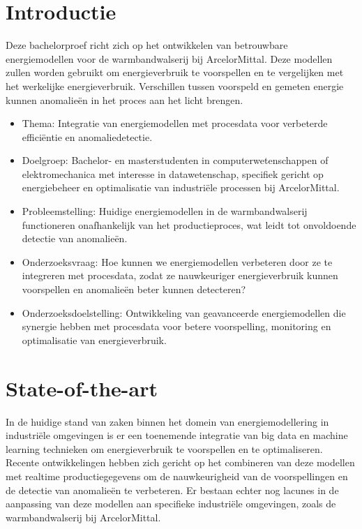 \section{Introductie}%
\label{sec:introductie}

Deze bachelorproef richt zich op het ontwikkelen van betrouwbare energiemodellen voor de warmbandwalserij bij ArcelorMittal. Deze modellen zullen worden gebruikt om energieverbruik te voorspellen en te vergelijken met het werkelijke energieverbruik. Verschillen tussen voorspeld en gemeten energie kunnen anomalieën in het proces aan het licht brengen.

\begin{itemize}
  \item Thema: Integratie van energiemodellen met procesdata voor verbeterde efficiëntie en anomaliedetectie.
  \item Doelgroep: Bachelor- en masterstudenten in computerwetenschappen of elektromechanica met interesse in datawetenschap, specifiek gericht op energiebeheer en optimalisatie van industriële processen bij ArcelorMittal.
  \item Probleemstelling: Huidige energiemodellen in de warmbandwalserij functioneren onafhankelijk van het productieproces, wat leidt tot onvoldoende detectie van anomalieën.
  \item Onderzoeksvraag: Hoe kunnen we energiemodellen verbeteren door ze te integreren met procesdata, zodat ze nauwkeuriger energieverbruik kunnen voorspellen en anomalieën beter kunnen detecteren?
  \item Onderzoeksdoelstelling: Ontwikkeling van geavanceerde energiemodellen die synergie hebben met procesdata voor betere voorspelling, monitoring en optimalisatie van energieverbruik.
\end{itemize}

\section{State-of-the-art}%
\label{sec:state-of-the-art}

In de huidige stand van zaken binnen het domein van energiemodellering in industriële omgevingen is er een toenemende integratie van big data en machine learning technieken om energieverbruik te voorspellen en te optimaliseren. Recente ontwikkelingen hebben zich gericht op het combineren van deze modellen met realtime productiegegevens om de nauwkeurigheid van de voorspellingen en de detectie van anomalieën te verbeteren. Er bestaan echter nog lacunes in de aanpassing van deze modellen aan specifieke industriële omgevingen, zoals de warmbandwalserij bij ArcelorMittal.

